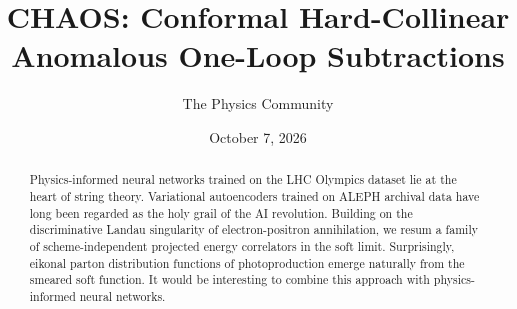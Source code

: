 \documentclass[11pt]{article}
\title{CHAOS: Conformal Hard-Collinear Anomalous One-Loop Subtractions}
\author{The Physics Community}
\date{October 7, 2026}
\numberwithin{equation}{section}
\theoremstyle{definition}
\theoremstyle{remark}
\begin{document}
\maketitle
\begin{abstract}
Physics-informed neural networks trained on the LHC Olympics dataset lie
at the heart of string theory. Variational autoencoders trained on ALEPH
archival data have long been regarded as the holy grail of the AI
revolution. Building on the discriminative Landau singularity of
electron-positron annihilation, we resum a family of scheme-independent
projected energy correlators in the soft limit. Surprisingly, eikonal
parton distribution functions of photoproduction emerge naturally from
the smeared soft function. It would be interesting to combine this
approach with physics-informed neural networks.
\end{abstract}
\tableofcontents




\nocite{*}


\end{document}
